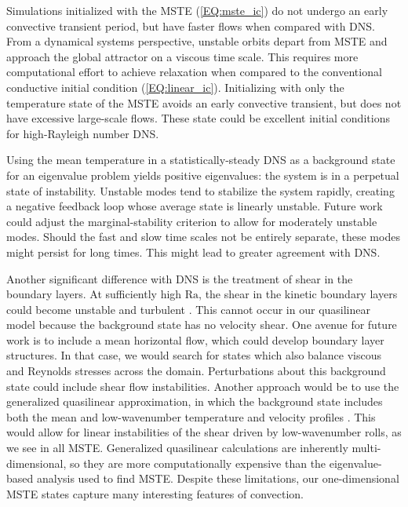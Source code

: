 \documentclass[reprint,amsmath,amssymb,aps,nofootinbib]{revtex4-1}
\newcommand\Ra{\mathrm{Ra}}
\newcommand{\eq}[1]{(\ref{#1})}
\begin{document}
Simulations initialized with the MSTE \eq{EQ:mste_ic} do not undergo an early convective transient period, but have faster flows when compared with DNS.
From a dynamical systems perspective, unstable orbits depart from MSTE and approach the global attractor on a viscous time scale.
This requires more computational effort to achieve relaxation when compared to the conventional conductive initial condition \eq{EQ:linear_ic}.
Initializing with only the temperature state of the MSTE avoids an early convective transient, but does not have excessive large-scale flows.
These state could be excellent initial conditions for high-Rayleigh number DNS.

Using the mean temperature in a statistically-steady DNS as a background state for an eigenvalue problem yields positive eigenvalues: the system is in a perpetual state of instability. 
Unstable modes tend to stabilize the system rapidly, creating a negative feedback loop whose average state is linearly unstable. 
Future work could adjust the marginal-stability criterion to allow for moderately unstable modes.
Should the fast and slow time scales not be entirely separate, these modes might persist for long times. 
This might lead to greater agreement with DNS.

Another significant difference with DNS is the treatment of shear in the boundary layers.
At sufficiently high $\Ra$, the shear in the kinetic boundary layers could become unstable and turbulent \cite{Ahlers}.
This cannot occur in our quasilinear model because the background state has no velocity shear.
One avenue for future work is to include a mean horizontal flow, which could develop boundary layer structures.
In that case, we would search for states which also balance viscous and Reynolds stresses across the domain.
Perturbations about this background state could include shear flow instabilities.
Another approach would be to use the generalized quasilinear approximation, in which the background state includes both the mean and low-wavenumber temperature and velocity profiles \cite{marston2016}.
This would allow for linear instabilities of the shear driven by low-wavenumber rolls, as we see in all MSTE.
Generalized quasilinear calculations are inherently multi-dimensional, so they are more computationally expensive than the eigenvalue-based analysis used to find MSTE.
Despite these limitations, our one-dimensional MSTE states capture many interesting features of convection.


\end{document}
